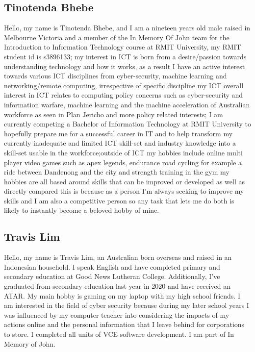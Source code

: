 \documentclass[a4paper,12pt]{extreport}
\begin{document}
	  \subsection*{Tinotenda Bhebe}

	      Hello, my name is Tinotenda Bhebe, and I am a nineteen years old male raised in Melbourne Victoria and a member of the In Memory Of John team for the Introduction to Information Technology course at RMIT University, my RMIT student id is s3896133; my interest in ICT is born from a desire/passion towards understanding technology and how it works, as a result I have an active interest towards various ICT disciplines from cyber-security, machine learning and networking/remote computing, irrespective of specific discipline my ICT overall interest in ICT relates to computing policy concerns such as cyber-security and information warfare, machine learning and the machine acceleration of Australian workforce as seen in Plan Jericho and more policy related interests; I am currently competing a Bachelor of Information Technology at RMIT University to hopefully prepare me for a successful career in IT and to help transform my currently inadequate and limited ICT skill-set and industry knowledge into a skill-set usable in the workforce;outside of ICT my hobbies include online multi player video games such as apex legends, endurance road cycling for example a ride between Dandenong and the city and strength training in the gym my hobbies are all based around skills that can be improved or developed as well as directly compared this is because as a person I'm always seeking to improve my skills and I am also a competitive person so any task that lets me do both is likely to instantly become a beloved hobby of mine.\newline

	  \subsection*{Travis Lim}

	      Hello, my name is Travis Lim, an Australian born overseas and raised in an Indonesian household. I speak English and have completed primary and secondary education at Good News Lutheran College. Additionally, I’ve graduated from secondary education last year in 2020 and have received an ATAR. My main hobby is gaming on my laptop with my high school friends. I am interested in the field of cyber security because during my later school years I was influenced by my computer teacher into considering the impacts of my actions online and the personal information that I leave behind for corporations to store. I completed all units of VCE software development. I am part of In Memory of John.
\end{document}

